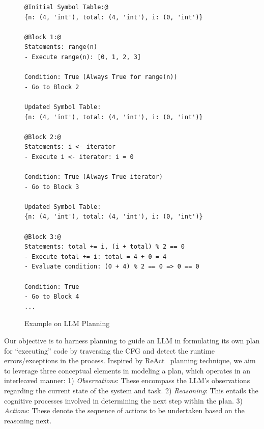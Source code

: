 \begin{figure}
  \centering
  \footnotesize
\begin{lstlisting}[]
@Initial Symbol Table:@
{n: (4, 'int'), total: (4, 'int'), i: (0, 'int')}

@Block 1:@
Statements: range(n)
- Execute range(n): [0, 1, 2, 3]

Condition: True (Always True for range(n))
- Go to Block 2

Updated Symbol Table:
{n: (4, 'int'), total: (4, 'int'), i: (0, 'int')}

@Block 2:@
Statements: i <- iterator
- Execute i <- iterator: i = 0

Condition: True (Always True iterator)
- Go to Block 3

Updated Symbol Table:
{n: (4, 'int'), total: (4, 'int'), i: (0, 'int')}

@Block 3:@
Statements: total += i, (i + total) % 2 == 0
- Execute total += i: total = 4 + 0 = 4
- Evaluate condition: (0 + 4) % 2 == 0 => 0 == 0

Condition: True
- Go to Block 4
...
\end{lstlisting}
\vspace{-12pt}
\caption{Example on LLM Planning}
\label{fig:motiv-gpt}
\end{figure}



Our objective is to harness planning to guide an LLM in formulating
its own plan for ``executing'' code by traversing the CFG and detect
the runtime errors/exceptions in the process. Inspired by
ReAct~\cite{yao2023react} planning technique, we aim to leverage three
conceptual elements in modeling a plan, which operates in an
interleaved manner: 1) {\em Observations}: These encompass the LLM's
observations regarding the current state of the system and task. 2)
{\em Reasoning}: This entails the cognitive processes involved in
determining the next step within the plan. 3) {\em Actions}:
These denote the sequence of actions to be undertaken based on the
reasoning next.

